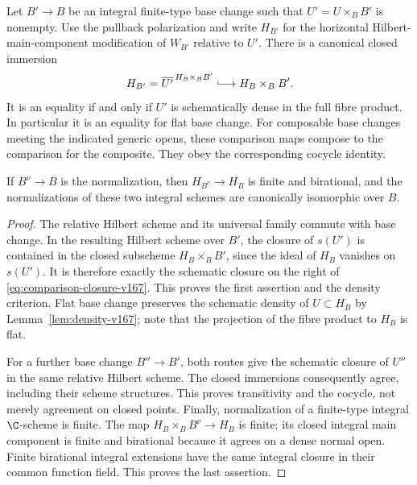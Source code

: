 \begin{theorem}
\label{thm:basechange-v167}
Let $B'\to B$ be an integral finite-type base change such that
$U'=U\times_BB'$ is nonempty. Use the pullback polarization and
write $H_{B'}$ for the horizontal Hilbert-main-component
modification of $W_{B'}$ relative to $U'$. There is a canonical
closed immersion
\begin{equation}\label{eq:comparison-closure-v167}
 H_{B'}=\overline{U'}^{\,H_B\times_BB'}
                    \lhook\joinrel\longrightarrow H_B\times_BB'.
\end{equation}
It is an equality if and only if $U'$ is schematically dense in
the full fibre product. In particular it is an equality for flat
base change. For composable base changes meeting the indicated
generic opens, these comparison maps compose to the comparison
for the composite. They obey the corresponding cocycle identity.

If $B^\nu\to B$ is the normalization, then $H_{B^\nu}\to H_B$
is finite and birational, and the normalizations of these two
integral schemes are canonically isomorphic over $B$.
\end{theorem}
\begin{proof}
The relative Hilbert scheme and its universal family commute with
base change. In the resulting Hilbert scheme over $B'$, the
closure of $s(U')$ is contained in the closed subscheme
$H_B\times_BB'$, since the ideal of $H_B$ vanishes on $s(U')$.
It is therefore exactly the schematic closure on the right of
\eqref{eq:comparison-closure-v167}. This proves the first
assertion and the density criterion. Flat base change preserves
the schematic density of $U\subset H_B$ by
Lemma~\ref{lem:density-v167}; note that the projection of the
fibre product to $H_B$ is flat.

For a further base change $B''\to B'$, both routes give the
schematic closure of $U''$ in the same relative Hilbert scheme.
The closed immersions consequently agree, including their scheme
structures. This proves transitivity and the cocycle, not merely
agreement on closed points. Finally, normalization of a finite-type
integral $\C$-scheme is finite. The map
$H_B\times_B B^\nu\to H_B$ is finite; its closed integral main
component is finite and birational because it agrees on a dense
normal open. Finite birational integral extensions have the same
integral closure in their common function field. This proves the
last assertion.
\end{proof}

